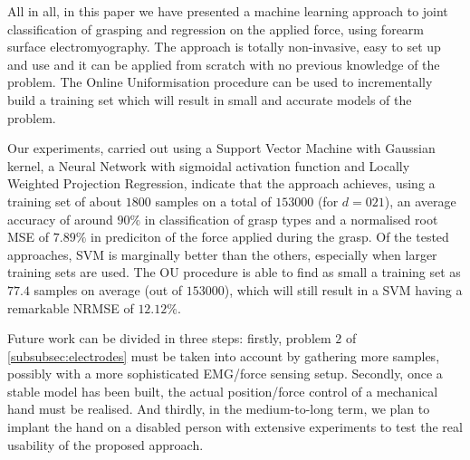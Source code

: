 All in all, in this paper we have presented a machine learning
approach to joint classification of grasping and regression on the
applied force, using forearm surface electromyography. The approach is
totally non-invasive, easy to set up and use and it can be applied
from scratch with no previous knowledge of the problem. The Online
Uniformisation procedure can be used to incrementally build a training
set which will result in small and accurate models of the problem.

Our experiments, carried out using a Support Vector Machine with
Gaussian kernel, a Neural Network with sigmoidal activation function
and Locally Weighted Projection Regression, indicate that the approach
achieves, using a training set of about $1800$ samples on a total of
$153000$ (for $d=021$), an average accuracy of around $90\%$ in
classification of grasp types and a normalised root MSE of $7.89\%$ in
prediciton of the force applied during the grasp. Of the tested
approaches, SVM is marginally better than the others, especially when
larger training sets are used. The OU procedure is able to find as
small a training set as $77.4$ samples on average (out of $153000$),
which will still result in a SVM having a remarkable NRMSE of
$12.12\%$.

Future work can be divided in three steps: firstly, problem $2$ of 
\ref{subsubsec:electrodes} must be taken into account by gathering
more samples, possibly with a more sophisticated EMG/force sensing
setup. Secondly, once a stable model has been built, the actual
position/force control of a mechanical hand must be realised. And
thirdly, in the medium-to-long term, we plan to implant the hand on a
disabled person with extensive experiments to test the real usability
of the proposed approach.
